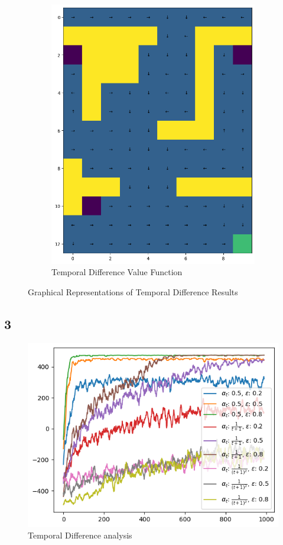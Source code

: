 \begin{figure}[H]
\begin{subfigure}[b]{0.4\textwidth}
        \includegraphics[width=\textwidth]{assets/td/td_policy.png}        
        \caption{Temporal Difference Value Function}
    \end{subfigure}
    \caption*{Graphical Representations of Temporal Difference Results}
\end{figure} 


\subsection*{3}

\begin{figure}[H]
    \centering
    \includegraphics[width=\textwidth]{assets/td/td_analysis.png}        
    \caption{Temporal Difference analysis}
    \label{figure:temporal difference analysis}
\end{figure} 


